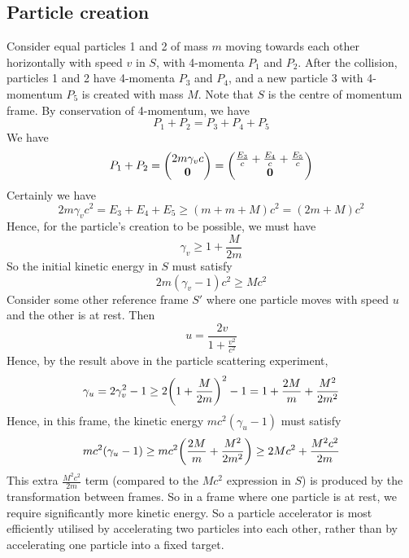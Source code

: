 \subsection{Particle creation}
Consider equal particles 1 and 2 of mass \(m\) moving towards each other horizontally with speed \(v\) in \(S\), with 4-momenta \(P_1\) and \(P_2\).
After the collision, particles 1 and 2 have 4-momenta \(P_3\) and \(P_4\), and a new particle 3 with 4-momentum \(P_5\) is created with mass \(M\).
Note that \(S\) is the centre of momentum frame.
By conservation of 4-momentum, we have
\[
	P_1 + P_2 = P_3 + P_4 + P_5
\]
We have
\[
	P_1 + P_2 = \begin{pmatrix}
		2m\gamma_v c \\ \vb 0
	\end{pmatrix} = \begin{pmatrix}
		\frac{E_3}{c} + \frac{E_4}{c} + \frac{E_5}{c} \\
		\vb 0
	\end{pmatrix}
\]
Certainly we have
\[
	2m\gamma_v c^2 = E_3 + E_4 + E_5 \geq (m + m + M)c^2 = (2m + M)c^2
\]
Hence, for the particle's creation to be possible, we must have
\[
	\gamma_v \geq 1 + \frac{M}{2m}
\]
So the initial kinetic energy in \(S\) must satisfy
\[
	2m(\gamma_v - 1)c^2 \geq Mc^2
\]
Consider some other reference frame \(S'\) where one particle moves with speed \(u\) and the other is at rest.
Then
\[
	u = \frac{2v}{1 + \frac{v^2}{c^2}}
\]
Hence, by the result above in the particle scattering experiment,
\[
	\gamma_u = 2\gamma_v^2 - 1 \geq 2\qty(1 + \frac{M}{2m})^2 - 1 = 1 + \frac{2M}{m} + \frac{M^2}{2m^2}
\]
Hence, in this frame, the kinetic energy \(mc^2(\gamma_u - 1)\) must satisfy
\[
	mc^2(\gamma_u - 1) \geq mc^2\qty(\frac{2M}{m} + \frac{M^2}{2m^2}) \geq 2Mc^2 + \frac{M^2c^2}{2m}
\]
This extra \(\frac{M^2c^2}{2m}\) term (compared to the \(Mc^2\) expression in \(S\)) is produced by the transformation between frames.
So in a frame where one particle is at rest, we require significantly more kinetic energy.
So a particle accelerator is most efficiently utilised by accelerating two particles into each other, rather than by accelerating one particle into a fixed target.
